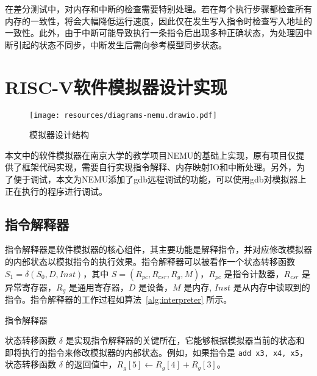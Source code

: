 在差分测试中，对内存和中断的检查需要特别处理。若在每个执行步骤都检查所有内存的一致性，将会大幅降低运行速度，因此仅在发生写入指令时检查写入地址的一致性。此外，由于中断可能导致执行一条指令后出现多种正确状态，为处理因中断引起的状态不同步，中断发生后需向参考模型同步状态。

\section{RISC-V软件模拟器设计实现}\label{section:nemu}

\begin{figure}
    \centering
    \texttt{[image: resources/diagrams-nemu.drawio.pdf]}
    \caption{模拟器设计结构}
    \label{fig:nemu}
\end{figure}

本文中的软件模拟器在南京大学的教学项目NEMU的基础上实现，原有项目仅提供了框架代码实现，需要自行实现指令解释、内存映射IO和中断处理。另外，为了便于调试，本文为NEMU添加了gdb远程调试的功能，可以使用gdb对模拟器上正在执行的程序进行调试。

\subsection{指令解释器}

指令解释器是软件模拟器的核心组件，其主要功能是解释指令，并对应修改模拟器的内部状态以模拟指令的执行效果。指令解释器可以被看作一个状态转移函数 $S_1 = \delta (S_0,D, Inst)$，其中 $S=(R_{pc},R_{csr},R_{g},M)$，$R_{pc}$ 是指令计数器，$R_{csr}$ 是异常寄存器，$R_g$ 是通用寄存器，$D$ 是设备，$M$ 是内存, $Inst$ 是从内存中读取到的指令。指令解释器的工作过程如算法~\ref{alg:interpreter} 所示。

\begin{algorithm}
    \DontPrintSemicolon
    \caption{指令解释器}\label{alg:interpreter}
\end{algorithm}

状态转移函数 $\delta$ 是实现指令解释器的关键所在，它能够根据模拟器当前的状态和即将执行的指令来修改模拟器的内部状态。例如，如果指令是 \lstinline{add x3, x4, x5}，状态转移函数 $\delta$ 的返回值中，$R_{g}[5] \gets R_{g}[4] + R_{g}[3]$。

